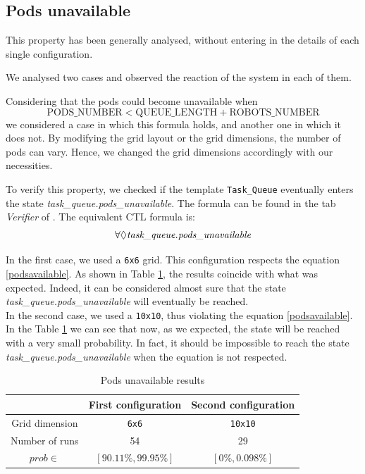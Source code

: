 \subsection{Pods unavailable} \label{podsunavailable}
This property has been generally analysed, without entering in the details of each single configuration.

We analysed two cases and observed the reaction of the system in each of them.

Considering that the pods could become unavailable when 
\begin{equation} \label{podsavailable}
    \text{PODS\_NUMBER} < \text{QUEUE\_LENGTH} + \text{ROBOTS\_NUMBER}
\end{equation}
we considered a case in which this formula holds, and another one in which it does not. By modifying the grid layout or the grid dimensions, the number of pods can vary. Hence, we changed the grid dimensions accordingly with our necessities.

To verify this property, we checked if the template \texttt{Task\_Queue} eventually enters the state \emph{task\_queue.pods\_unavailable}. The formula can be found in the tab \emph{Verifier} of \UPPAAL. The equivalent CTL formula is:
\begin{equation}
    \forall \lozenge \text{\emph{task\_queue.pods\_unavailable}}
\end{equation}

In the first case, we used a \texttt{6x6} grid. This configuration respects the equation \ref{podsavailable}. As shown in Table \ref{tab:tabpodsunavailable}, the results coincide with what was expected. Indeed, it can be considered almost sure that the state \emph{task\_queue.pods\_unavailable} will eventually be reached.
\\

In the second case, we used a \texttt{10x10}, thus violating the equation \ref{podsavailable}. In the Table \ref{tab:tabpodsunavailable} we can see that now, as we expected, the state will be reached with a very small probability. In fact, it should be impossible to reach the state \emph{task\_queue.pods\_unavailable} when the equation is not respected.

\begin{table}[h]
    \centering
        \begin{tabular}{| c || c c |} 
            \hline
             & First configuration & Second configuration \\ [0.5ex] 
            \hline\hline
            Grid dimension & \texttt{6x6} & \texttt{10x10} \\
            Number of runs & 54 & 29 \\
            \hline\hline
            $prob \in$ &  $[90.11\%,99.95\%]$ & $[0\%,0.098\%]$\\ [0.5ex] 
            \hline
        \end{tabular}
        \caption{Pods unavailable results}
        \label{tab:tabpodsunavailable}
    \end{table}

